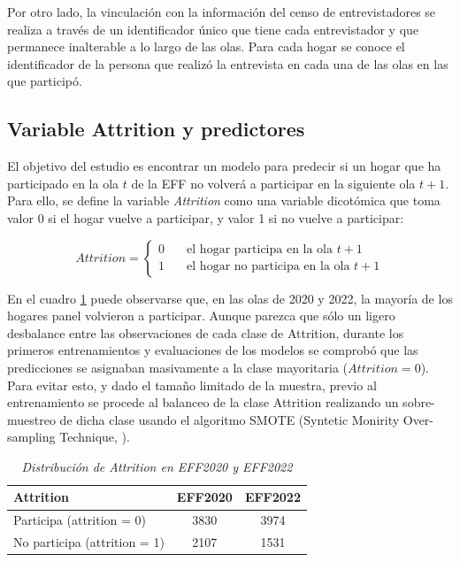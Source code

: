 Por otro lado, la vinculación con la información del censo de entrevistadores se realiza a través de un identificador único que tiene cada entrevistador y que permanece inalterable a lo largo de las olas. Para cada hogar se conoce el identificador de la persona que realizó la entrevista en cada una de las olas en las que participó.


\subsection*{Variable Attrition y predictores}

El objetivo del estudio es encontrar un modelo para predecir si un hogar que ha participado en la ola $t$ de la EFF no volverá a participar en la siguiente ola $t+1$. Para ello, se define la variable \textit{Attrition} como una variable dicotómica que toma valor 0 si el hogar vuelve a participar, y valor 1 si no vuelve a participar:

\begin{equation}
Attrition =
  \begin{cases}
    0       & \quad \text{el hogar participa en la ola $t+1$} \\
    1  & \quad \text{el hogar no participa en la ola $t+1$}
  \end{cases}
\end{equation}

En el cuadro \ref{table:attrition} puede observarse que, en las olas de 2020 y 2022, la mayoría de los hogares panel volvieron a participar. Aunque parezca que sólo un ligero desbalance entre las observaciones de cada clase de Attrition, durante los primeros entrenamientos y evaluaciones de los modelos se comprobó que las predicciones se asignaban masivamente a la clase mayoritaria ($Attrition=0$). Para evitar esto, y dado el tamaño limitado de la muestra, previo al entrenamiento se procede al balanceo de la clase Attrition realizando un sobre-muestreo de dicha clase usando el algoritmo SMOTE (Syntetic Monirity Over-sampling Technique, \cite{chawla2002smote}).

\begin{table}[ht]
\centering{}
\begin{tabular}{lcc}
\textbf{Attrition}           & \textbf{EFF2020} & \textbf{EFF2022} \\ \hline
Participa (attrition = 0)    & 3830             & 3974             \\
No participa (attrition = 1) & 2107             & 1531             \\ \hline
\end{tabular}
\caption{\textit{Distribución de Attrition en EFF2020 y EFF2022}}
\label{table:attrition}
\end{table}

